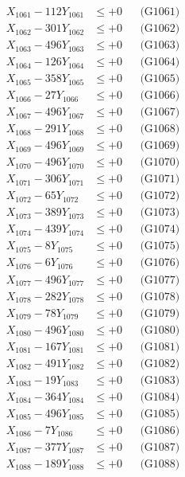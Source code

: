 \documentclass[a4paper,10pt]{article}
\begin{document}
{\begin{align}
\allowbreak
X_{1061} - 112Y_{1061} &\leq +0 && \text{(G1061)} \\
X_{1062} - 301Y_{1062} &\leq +0 && \text{(G1062)} \\
X_{1063} - 496Y_{1063} &\leq +0 && \text{(G1063)} \\
X_{1064} - 126Y_{1064} &\leq +0 && \text{(G1064)} \\
X_{1065} - 358Y_{1065} &\leq +0 && \text{(G1065)} \\
X_{1066} - 27Y_{1066} &\leq +0 && \text{(G1066)} \\
X_{1067} - 496Y_{1067} &\leq +0 && \text{(G1067)} \\
X_{1068} - 291Y_{1068} &\leq +0 && \text{(G1068)} \\
X_{1069} - 496Y_{1069} &\leq +0 && \text{(G1069)} \\
X_{1070} - 496Y_{1070} &\leq +0 && \text{(G1070)} \\
\allowbreak
X_{1071} - 306Y_{1071} &\leq +0 && \text{(G1071)} \\
X_{1072} - 65Y_{1072} &\leq +0 && \text{(G1072)} \\
X_{1073} - 389Y_{1073} &\leq +0 && \text{(G1073)} \\
X_{1074} - 439Y_{1074} &\leq +0 && \text{(G1074)} \\
X_{1075} - 8Y_{1075} &\leq +0 && \text{(G1075)} \\
X_{1076} - 6Y_{1076} &\leq +0 && \text{(G1076)} \\
X_{1077} - 496Y_{1077} &\leq +0 && \text{(G1077)} \\
X_{1078} - 282Y_{1078} &\leq +0 && \text{(G1078)} \\
X_{1079} - 78Y_{1079} &\leq +0 && \text{(G1079)} \\
X_{1080} - 496Y_{1080} &\leq +0 && \text{(G1080)} \\
\allowbreak
X_{1081} - 167Y_{1081} &\leq +0 && \text{(G1081)} \\
X_{1082} - 491Y_{1082} &\leq +0 && \text{(G1082)} \\
X_{1083} - 19Y_{1083} &\leq +0 && \text{(G1083)} \\
X_{1084} - 364Y_{1084} &\leq +0 && \text{(G1084)} \\
X_{1085} - 496Y_{1085} &\leq +0 && \text{(G1085)} \\
X_{1086} - 7Y_{1086} &\leq +0 && \text{(G1086)} \\
X_{1087} - 377Y_{1087} &\leq +0 && \text{(G1087)} \\
X_{1088} - 189Y_{1088} &\leq +0 && \text{(G1088)} \\

\end{align}}
\end{document}
